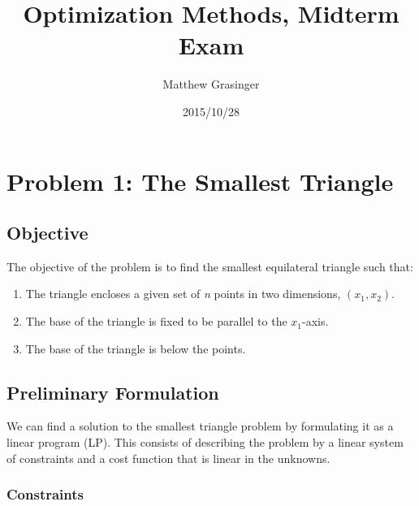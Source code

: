 \documentclass{article}
\title{Optimization Methods, Midterm Exam}
\date{2015/10/28}
\author{Matthew Grasinger}
\newcommand{\blankpage}{
	\newpage
	\thispagestyle{empty}
	\mbox{}
	\newpage
}
\begin{document}
	
	
\maketitle
\blankpage

\newpage
\tableofcontents
\blankpage
{}

\section{Problem 1: The Smallest Triangle} \label{sec:small_triangle}

\subsection{Objective}

The objective of the problem is to find the smallest equilateral triangle such that: 
\begin{enumerate}
	\item \label{enum:enclose} The triangle encloses a given set of \textit{n} points in two dimensions, $(x_1, x_2)$.
	\item \label{enum:base_parallel} The base of the triangle is fixed to be parallel to the $x_1$-axis.
	\item \label{enum:base_below} The base of the triangle is below the points.
\end{enumerate}

\subsection{Preliminary Formulation}

We can find a solution to the smallest triangle problem by formulating it as a linear program (LP).
This consists of describing the problem by a linear system of constraints and a cost function that is linear in the unknowns.

\subsubsection{Constraints}
\end{document}
